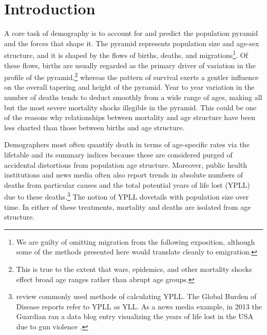 \documentclass{article}
\begin{document}
\section*{Introduction}
A core task of demography is to account for and predict the population
pyramid and the forces that shape it. The pyramid represents population
size and age-sex structure, and it is shaped by the flows of births,
deaths, and migrations\footnote{We are guilty of omitting migration from
the following exposition, although some of the methods presented here would
translate cleanly to emigration.}. Of these flows, births are usually regarded
as the primary driver of variation in the profile of the pyramid,\footnote{This
is true to the extent that wars, epidemics, and other mortality shocks effect
broad age ranges rather than abrupt age groups.} whereas the pattern of survival
exerts a gentler influence on the overall tapering and height of the pyramid.
Year to year variation in the number of deaths tends to deduct
smoothly from a wide range of ages, making all but the most
severe mortality shocks illegible in the pyramid. This could be one of the
reasons why relationships between mortality and age structure have been less charted than those between births and age structure.

Demographers most often quantify death in terms of age-specific rates via the
lifetable and its summary indices because these are considered purged of
accidental distortions from population age structure. Moreover, public health
institutions and news media often also report trends in absolute numbers of
deaths from particular causes and the total potential years of life lost (YPLL) due to these deaths.\footnote{\citet{gardner1990} review commonly used methods of
calculating YPLL. The Global Burden of Disease reports refer to YPLL as YLL.
As a news media example, in 2013 the Guardian ran a data blog entry
visualizing the years of life lost in the USA due to gun violence
\citep{rogers2013gun}. } The notion of YPLL dovetails with
population size over time. In either of these treatments, mortality and deaths are
isolated from age structure. 
\end{document}
